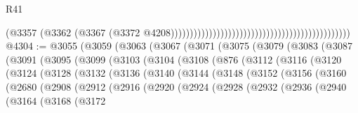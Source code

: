 \begin{lexlean}{R41}
\begin{coremodule}
                                                                                          (@3357
                                                                                            (@3362
                                                                                              (@3367
                                                                                                (@3372
                                                                                                  @4208)))))))))))))))))))))))))))))))))))))))))))))))
@4304 := @3055
    (@3059
      (@3063
        (@3067
          (@3071
            (@3075
              (@3079
                (@3083
                  (@3087
                    (@3091
                      (@3095
                        (@3099
                          (@3103
                            (@3104
                              (@3108
                                (@876
                                  (@3112
                                    (@3116
                                      (@3120
                                        (@3124
                                          (@3128
                                            (@3132
                                              (@3136
                                                (@3140
                                                  (@3144
                                                    (@3148
                                                      (@3152
                                                        (@3156
                                                          (@3160
                                                            (@2680
                                                              (@2908
                                                                (@2912
                                                                  (@2916
                                                                    (@2920
                                                                      (@2924
                                                                        (@2928
                                                                          (@2932
                                                                            (@2936
                                                                              (@2940
                                                                                (@3164
                                                                                  (@3168
                                                                                    (@3172

\end{coremodule}
\end{lexlean}
